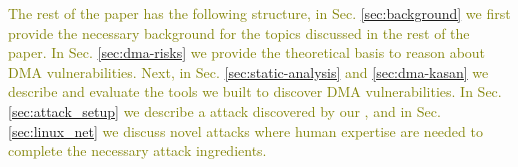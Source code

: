 \textcolor{olive}{The rest of the paper has the following structure,
in Sec. \ref{sec:background} we first provide the necessary background for the topics discussed in the rest of the paper. In Sec. \ref{sec:dma-risks} we provide the theoretical basis to reason about DMA vulnerabilities.
Next, in Sec. \ref{sec:static-analysis} and \ref{sec:dma-kasan} we describe and evaluate the tools we built to discover DMA vulnerabilities. In Sec. \ref{sec:attack_setup} we describe a \simple attack discovered by our \tool, and in Sec. \ref{sec:linux_net} we discuss novel \compound attacks where human expertise are needed to complete the necessary attack ingredients.}


